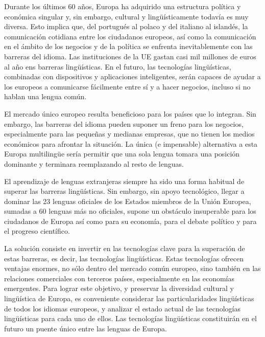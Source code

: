 \vspace*{-4mm}
\begin{multicols}{2}
  Durante los últimos 60 años, Europa ha adquirido una estructura política y económica singular y, sin embargo, cultural y lingüísticamente todavía es muy diversa. Esto implica que, del portugués al polaco y del italiano al islandés, la comunicación cotidiana entre los ciudadanos europeos, así como la comunicación en el ámbito de los negocios y de la política se enfrenta inevitablemente con las barreras del idioma. Las instituciones de la UE gastan casi mil millones de euros al año ens barreras lingüísticas. En el futuro, las tecnologías lingüísticas, combinadas con dispositivos y aplicaciones inteligentes, serán capaces de ayudar a los europeos a comunicarse fácilmente entre sí y a hacer negocios, incluso si no hablan una lengua común.


El mercado único europeo resulta beneficioso para los países que lo integran. Sin embargo, las barreras del idioma pueden suponer un freno para los negocios, especialmente para las pequeñas y medianas empresas, que no tienen los medios económicos para afrontar la situación. La única (e impensable) alternativa a esta Europa multilingüe sería permitir que una sola lengua tomara una posición dominante y terminara reemplazando al resto de lenguas.

El aprendizaje de lenguas extranjeras siempre ha sido una forma habitual de superar las barreras lingüísticas. Sin embargo, sin apoyo tecnológico, llegar a dominar las 23 lenguas oficiales de los Estados miembros de la Unión Europea, sumadas a 60 lenguas más no oficiales, supone un obstáculo insuperable para los ciudadanos de Europa así como para su economía, para el debate político y para el progreso científico.

La solución consiste en invertir en las tecnologías clave para la superación de estas barreras, es decir, las tecnologías lingüísticas. Estas tecnologías ofrecen ventajas enormes, no sólo dentro del mercado común europeo, sino también en las relaciones comerciales con terceros países, especialmente en las economías emergentes. Para lograr este objetivo, y preservar la diversidad cultural y lingüística de Europa, es conveniente considerar las particularidades lingüísticas de todos los idiomas europeos, y analizar el estado actual de las tecnologías lingüísticas para cada uno de ellos. Las tecnologías lingüísticas constituirán en el futuro un puente único entre las lenguas de Europa.


\end{multicols}
